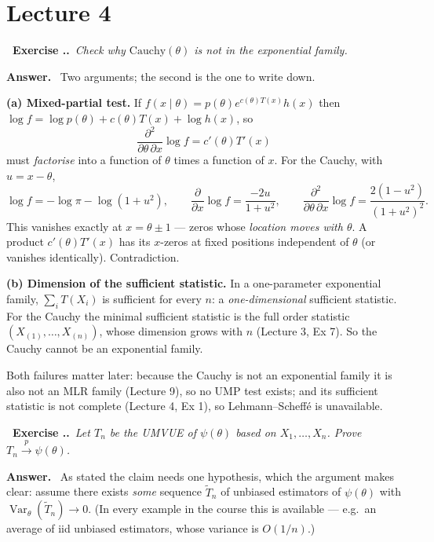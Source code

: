 \documentclass[11pt]{article}
\newcommand{\Var}{\operatorname{Var}}
\newcommand{\pto}{\overset{p}{\longrightarrow}}
\newcounter{exc}[section]
\newenvironment{exc}[1]{\medskip\refstepcounter{exc}%
  \noindent\textbf{\color{ForestGreen}\raisebox{0.5pt}{\scriptsize$\blacksquare$}\ Exercise \thesection.\theexc.}\ \textit{#1}\par\nopagebreak}{\par}
\newcommand{\ans}{\smallskip\noindent\textbf{Answer.}\ }
\begin{document}
\section{Lecture 4}

\begin{exc}{Check why $\mathrm{Cauchy}(\theta)$ is \emph{not} in the exponential family.}
\end{exc}
\ans
Two arguments; the second is the one to write down.

\textbf{(a) Mixed-partial test.} If $f(x\mid\theta)=p(\theta)e^{c(\theta)T(x)}h(x)$ then
$\log f=\log p(\theta)+c(\theta)T(x)+\log h(x)$, so
\[
\frac{\partial^2}{\partial\theta\,\partial x}\log f=c'(\theta)T'(x)
\]
must \emph{factorise} into a function of $\theta$ times a function of $x$. For the Cauchy,
with $u=x-\theta$,
\[
\log f=-\log\pi-\log(1+u^2),\qquad
\frac{\partial}{\partial x}\log f=\frac{-2u}{1+u^2},\qquad
\frac{\partial^2}{\partial\theta\,\partial x}\log f=\frac{2(1-u^2)}{(1+u^2)^2}.
\]
This vanishes exactly at $x=\theta\pm1$ --- zeros whose \emph{location moves with $\theta$}.
A product $c'(\theta)T'(x)$ has its $x$-zeros at fixed positions independent of $\theta$
(or vanishes identically). Contradiction.

\textbf{(b) Dimension of the sufficient statistic.} In a one-parameter exponential family,
$\sum_i T(X_i)$ is sufficient for every $n$: a \emph{one-dimensional} sufficient statistic.
For the Cauchy the minimal sufficient statistic is the full order statistic
$(X_{(1)},\dots,X_{(n)})$, whose dimension grows with $n$ (Lecture 3, Ex 7). So the Cauchy
cannot be an exponential family.

\begin{notebox}
Both failures matter later: because the Cauchy is not an exponential family it is also not an
MLR family (Lecture 9), so no UMP test exists; and its sufficient statistic is not complete
(Lecture 4, Ex 1), so Lehmann--Scheff\'e is unavailable.
\end{notebox}

\begin{exc}{Let $T_n$ be the UMVUE of $\psi(\theta)$ based on $X_1,\dots,X_n$. Prove
$T_n\pto\psi(\theta)$.}
\end{exc}
\ans
As stated the claim needs one hypothesis, which the argument makes clear: assume there exists
\emph{some} sequence $\tilde T_n$ of unbiased estimators of $\psi(\theta)$ with
$\Var_\theta(\tilde T_n)\to0$. (In every example in the course this is available --- e.g.\ an
average of iid unbiased estimators, whose variance is $O(1/n)$.)
\end{document}
